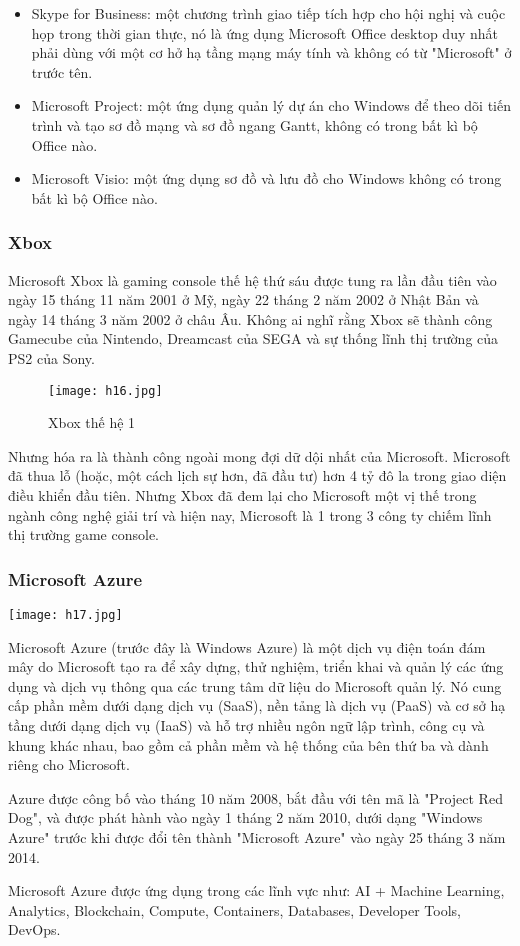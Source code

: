 \documentclass[12pt,a4paper]{article}  %
\begin{document}
\begin{itemize}
\item Skype for Business: một chương trình giao tiếp tích hợp cho hội nghị và cuộc họp trong thời gian thực, nó là ứng dụng Microsoft Office desktop duy nhất phải dùng với một cơ hở hạ tầng mạng máy tính và không có từ "Microsoft" ở trước tên.
\item Microsoft Project: một ứng dụng quản lý dự án cho Windows để theo dõi tiến trình và tạo sơ đồ mạng và sơ đồ ngang Gantt, không có trong bất kì bộ Office nào.
\item Microsoft Visio: một ứng dụng sơ đồ và lưu đồ cho Windows không có trong bất kì bộ Office nào.
\end{itemize}
\subsubsection{Xbox}
Microsoft Xbox là gaming console thế hệ thứ sáu được tung ra lần đầu tiên vào ngày 15 tháng 11 năm 2001 ở Mỹ, ngày 22 tháng 2 năm 2002 ở Nhật Bản và ngày 14 tháng 3 năm 2002 ở châu Âu. Không ai nghĩ rằng Xbox sẽ thành công Gamecube của Nintendo, Dreamcast của SEGA và sự thống lĩnh thị trường của PS2 của Sony.
\begin{figure}[!h]
	\centering
	\texttt{[image: h16.jpg]}
	\captionsetup{labelformat=empty}
	\caption{Xbox thế hệ 1}
\end{figure}

\noindent Nhưng hóa ra là thành công ngoài mong đợi dữ dội nhất của Microsoft. Microsoft đã thua lỗ (hoặc, một cách lịch sự hơn, đã đầu tư) hơn 4 tỷ đô la trong giao diện điều khiển đầu tiên. Nhưng Xbox đã đem lại cho Microsoft một vị thế trong ngành công nghệ giải trí và hiện nay, Microsoft là 1 trong 3 công ty chiếm lĩnh thị trường game console.
\subsubsection{Microsoft Azure}
\begin{center}
	\texttt{[image: h17.jpg]}
\end{center}
Microsoft Azure (trước đây là Windows Azure) là một dịch vụ điện toán đám mây do Microsoft tạo ra để xây dựng, thử nghiệm, triển khai và quản lý các ứng dụng và dịch vụ thông qua các trung tâm dữ liệu do Microsoft quản lý. Nó cung cấp phần mềm dưới dạng dịch vụ (SaaS), nền tảng là dịch vụ (PaaS) và cơ sở hạ tầng dưới dạng dịch vụ (IaaS) và hỗ trợ nhiều ngôn ngữ lập trình, công cụ và khung khác nhau, bao gồm cả phần mềm và hệ thống của bên thứ ba và dành riêng cho Microsoft.

\noindent Azure được công bố vào tháng 10 năm 2008, bắt đầu với tên mã là "Project Red Dog", và được phát hành vào ngày 1 tháng 2 năm 2010, dưới dạng "Windows Azure" trước khi được đổi tên thành "Microsoft Azure" vào ngày 25 tháng 3 năm 2014. 

\noindent Microsoft Azure được ứng dụng trong các lĩnh vực như: AI + Machine Learning, Analytics, Blockchain, Compute, Containers, Databases, Developer Tools, DevOps.
\end{document}
